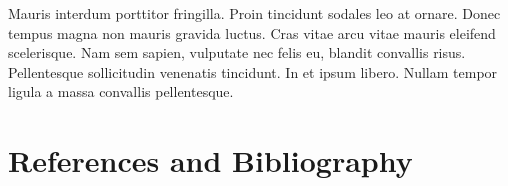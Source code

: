\documentclass{article}
\begin{document}
Mauris interdum porttitor fringilla. Proin tincidunt sodales leo at ornare. Donec tempus magna non mauris gravida luctus. Cras vitae arcu vitae mauris eleifend scelerisque. Nam sem sapien, vulputate nec felis eu, blandit convallis risus. Pellentesque sollicitudin venenatis tincidunt. In et ipsum libero. Nullam tempor ligula a massa convallis pellentesque.


\section{References and Bibliography}
\printbibliography[heading=none]
\end{document}

